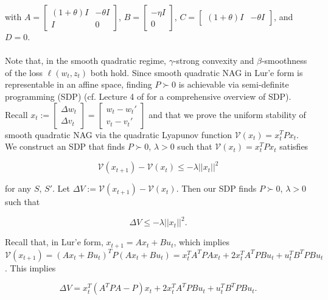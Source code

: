 \documentclass[twoside,11pt]{article}
\begin{document}
\noindent
with $A = \begin{bmatrix}
    (1+\theta)I & -\theta I \\
    I & 0
\end{bmatrix}$, $B = \begin{bmatrix}
    -\eta I \\
    0
\end{bmatrix}$, $C = \begin{bmatrix}
    (1+\theta)I & -\theta I
\end{bmatrix}$, and $D = 0$. \\
\\
Note that, in the smooth quadratic regime, $\gamma$-strong convexity and $\beta$-smoothness of the loss $\ell(w_t,z_t)$ both hold. Since smooth quadratic NAG in Lur'e form is representable in an affine space, finding $P \succ 0$ is achievable via semi-definite programming (SDP) (cf. Lecture 4 of \cite{BN01} for a comprehensive overview of SDP). Recall $x_t := \begin{bmatrix}
    \Delta w_t \\
    \Delta v_t
\end{bmatrix} = \begin{bmatrix}
    w_t - w_t' \\
    v_t - v_t'
\end{bmatrix}$ and that we prove the uniform stability of smooth quadratic NAG via the quadratic Lyapunov function $\mathcal{V}(x_t) = x_t^T Px_t$. We construct an SDP that finds $P \succ 0$, $\lambda > 0$ such that $\mathcal{V}(x_t) = x_t^T Px_t$ satisfies

\begin{equation}
\mathcal{V}(x_{t+1}) - \mathcal{V}(x_t) \leq -\lambda||x_t||^2
\end{equation}

\noindent
for any $S$, $S'$. Let $\Delta V:= \mathcal{V}(x_{t+1}) - \mathcal{V}(x_t)$. Then our SDP finds $P \succ 0$, $\lambda > 0$ such that

\begin{equation}
\Delta V \leq -\lambda ||x_t||^2.
\end{equation}

\noindent
Recall that, in Lur'e form, $x_{t+1} = Ax_t + Bu_t$, which implies $\mathcal{V}(x_{t+1}) = (Ax_t + Bu_t)^T P (Ax_t + Bu_t) = x_t^TA^TPAx_t + 2x_t^TA^TPBu_t + u_t^TB^TPBu_t$. This implies

\begin{equation}
\Delta V = x_t^T(A^TPA-P)x_t + 2x_t^TA^TPBu_t + u_t^TB^TPBu_t.
\end{equation}
\end{document}
